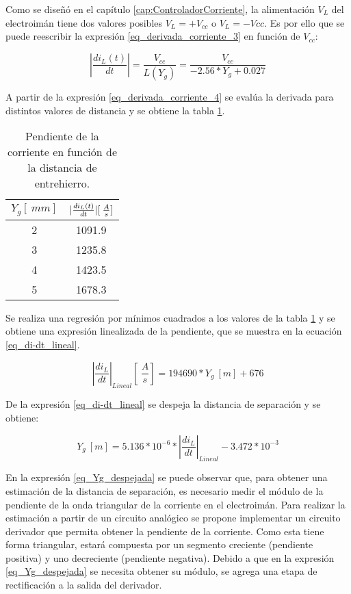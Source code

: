 Como se diseñó en el capítulo \ref{cap:ControladorCorriente}, la alimentación $V_L$ del electroimán tiene dos valores posibles $V_L=+V_{cc}$ o $V_L=-V{cc}$. Es por ello que se puede reescribir la expresión \ref{eq_derivada_corriente_3} en función de $V_{cc}$:

\begin{equation} \label{eq_derivada_corriente_4}
	\left|\frac{di_L(t)}{dt}\right|= \frac{V_{cc}}{L(Y_g)}=\frac{V_{cc}}{-2.56*Y_{g}+0.027}
\end{equation}

A partir de la expresión \ref{eq_derivada_corriente_4} se evalúa la derivada para distintos valores de distancia y se obtiene la tabla \ref{tab_derivada_linealizada}.

\begin{table}[H]
	\begin{center}
		\begin{tabular}{| c | c |}
			\hline
			$Y_g[\:mm]$ & $\lvert\frac{di_L(t)}{dt}\rvert [\:\frac{A}{s}]$\\ \hline
			2 & 1091.9 \\ \hline 
			3 & 1235.8 \\ \hline 
			4 & 1423.5 \\ \hline 
			5 & 1678.3 \\ \hline 
		\end{tabular}
		\caption{Pendiente de la corriente en función de la distancia de entrehierro.}
		\label{tab_derivada_linealizada}
	\end{center}
\end{table}

Se realiza una regresión por mínimos cuadrados a los valores de la tabla \ref{tab_derivada_linealizada} y se obtiene una expresión linealizada de la pendiente, que se  muestra en la ecuación \ref{eq_di-dt_lineal}.


\begin{equation} \label{eq_di-dt_lineal}
	{\left|\frac{di_L}{dt}\right|}_{Lineal}[\:\frac{A}{s}]= 194690 * Y_g\:[m]+676
\end{equation}

De la expresión \ref{eq_di-dt_lineal} se despeja la distancia de separación y se obtiene:

\begin{equation} \label{eq_Yg_despejada}
	Y_g\:[m] =5.136*10^{-6}*{\left|\frac{di_L}{dt}\right|}_{Lineal} - 3.472*10^{-3}
\end{equation}


En la expresión \ref{eq_Yg_despejada} se puede observar que, para obtener una estimación de la distancia de separación, es necesario medir el módulo de la pendiente de la onda triangular de la corriente en el electroimán. Para realizar la estimación a partir de un circuito analógico se propone implementar un circuito derivador que permita obtener la pendiente de la corriente. Como esta tiene forma triangular, estará compuesta por un segmento creciente (pendiente positiva) y uno decreciente (pendiente negativa). Debido a que en la expresión \ref{eq_Yg_despejada} se necesita obtener su módulo, se agrega una etapa de rectificación a la salida del derivador.

